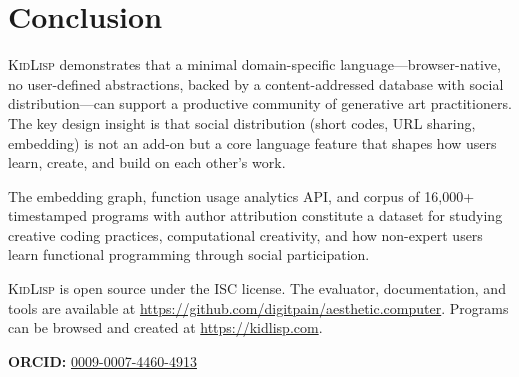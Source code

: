 \documentclass[10pt,letterpaper,twocolumn]{article}
\newcommand{\kidlisp}{\textsc{KidLisp}}
\begin{document}

\section{Conclusion}

\kidlisp{} demonstrates that a minimal domain-specific language---browser-native, no user-defined abstractions, backed by a content-addressed database with social distribution---can support a productive community of generative art practitioners. The key design insight is that social distribution (short codes, URL sharing, embedding) is not an add-on but a core language feature that shapes how users learn, create, and build on each other's work.

The embedding graph, function usage analytics API, and corpus of 16,000+ timestamped programs with author attribution constitute a dataset for studying creative coding practices, computational creativity, and how non-expert users learn functional programming through social participation.

\kidlisp{} is open source under the ISC license. The evaluator, documentation, and tools are available at \url{https://github.com/digitpain/aesthetic.computer}. Programs can be browsed and created at \url{https://kidlisp.com}.

\vspace{0.5em}
\noindent\textbf{ORCID:} \href{https://orcid.org/0009-0007-4460-4913}{0009-0007-4460-4913}




\end{document}
